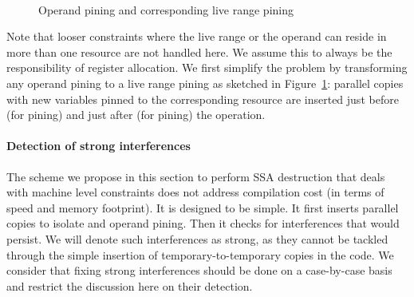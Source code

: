 \begin{figure}[h]
\hfill
{}
\\
\hfill
{}
\caption{\label{fig:alternative_ssa_destruction:pining}Operand pining and corresponding live range pining}
\end{figure}

Note that looser constraints where the live range or the operand can reside in more than one resource are not handled here. 
We assume this to always be the responsibility of register allocation. 
We first simplify the problem by transforming any operand pining to a live range pining as sketched in Figure~\ref{fig:alternative_ssa_destruction:pining}: 
parallel copies with new variables pinned to the corresponding resource are inserted just before (for \useop pining) and just after (for  pining) the operation.




\paragraph{Detection of strong interferences}
\label{par:alternative_ssa_destruction:strong}
The scheme we propose in this section to perform SSA destruction that deals with machine level constraints does not address compilation cost (in terms of speed and memory footprint). 
It is designed to be simple. 
It first inserts parallel copies to isolate \phifuns and operand pining. 
Then it checks for interferences that would persist. 
We will denote such interferences as strong, as they cannot be tackled through the simple insertion of temporary-to-temporary copies in the code. 
We consider that fixing strong interferences should be done on a case-by-case basis and restrict the discussion here on their detection.

